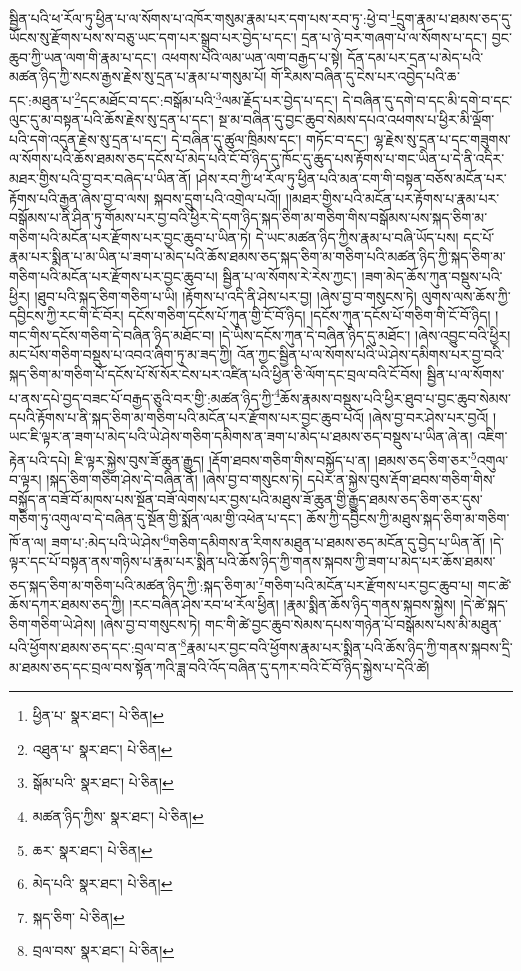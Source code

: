 སྦྱིན་པའི་ཕ་རོལ་ཏུ་ཕྱིན་པ་ལ་སོགས་པ་འཁོར་གསུམ་རྣམ་པར་དག་པས་རབ་ཏུ་:ཕྱེ་བ་\footnote{ཕྱིན་པ་  སྣར་ཐང་།  པེ་ཅིན། }དྲུག་རྣམ་པ་ཐམས་ཅད་དུ་ཡོངས་སུ་རྫོགས་པས་ས་བཅུ་ཡང་དག་པར་སྒྲུབ་པར་བྱེད་པ་དང་། དྲན་པ་ཉེ་བར་གཞག་པ་ལ་སོགས་པ་དང་། བྱང་ཆུབ་ཀྱི་ཡན་ལག་གི་རྣམ་པ་དང་། འཕགས་པའི་ལམ་ཡན་ལག་བརྒྱད་པ་སྟེ། དོན་དམ་པར་དྲན་པ་མེད་པའི་མཚན་ཉིད་ཀྱི་སངས་རྒྱས་རྗེས་སུ་དྲན་པ་རྣམ་པ་གསུམ་པོ། གོ་རིམས་བཞིན་དུ་ངེས་པར་འབྱེད་པའི་ཆ་དང་:མཐུན་པ་\footnote{འཐུན་པ་  སྣར་ཐང་།  པེ་ཅིན། }དང་མཐོང་བ་དང་:བསྒོམ་པའི་\footnote{སྒོམ་པའི་  སྣར་ཐང་།  པེ་ཅིན། }ལམ་རྗོད་པར་བྱེད་པ་དང་། དེ་བཞིན་དུ་དགེ་བ་དང་མི་དགེ་བ་དང་ལུང་དུ་མ་བསྟན་པའི་ཆོས་རྗེས་སུ་དྲན་པ་དང་། སྔ་མ་བཞིན་དུ་བྱང་ཆུབ་སེམས་དཔའ་འཕགས་པ་ཕྱིར་མི་ལྡོག་པའི་དགེ་འདུན་རྗེས་སུ་དྲན་པ་དང་། དེ་བཞིན་དུ་ཚུལ་ཁྲིམས་དང་། གཏོང་བ་དང་། ལྷ་རྗེས་སུ་དྲན་པ་དང་གཟུགས་ལ་སོགས་པའི་ཆོས་ཐམས་ཅད་དངོས་པོ་མེད་པའི་ངོ་བོ་ཉིད་དུ་ཁོང་དུ་ཆུད་པས་རྟོགས་པ་གང་ཡིན་པ་དེ་ནི་འདིར་མཐར་གྱིས་པའི་བྱ་བར་བཞེད་པ་ཡིན་ནོ། །ཤེས་རབ་ཀྱི་ཕ་རོལ་ཏུ་ཕྱིན་པའི་མན་ངག་གི་བསྟན་བཅོས་མངོན་པར་རྟོགས་པའི་རྒྱན་ཞེས་བྱ་བ་ལས། སྐབས་དྲུག་པའི་འགྲེལ་པའོ།། །།མཐར་གྱིས་པའི་མངོན་པར་རྟོགས་པ་རྣམ་པར་བསྒོམས་པ་ནི་ཤིན་ཏུ་གོམས་པར་བྱ་བའི་ཕྱིར་དེ་དག་ཉིད་སྐད་ཅིག་མ་གཅིག་གིས་བསྒོམས་པས་སྐད་ཅིག་མ་གཅིག་པའི་མངོན་པར་རྫོགས་པར་བྱང་ཆུབ་པ་ཡིན་ཏེ། དེ་ཡང་མཚན་ཉིད་ཀྱིས་རྣམ་པ་བཞི་ཡོད་པས། དང་པོ་རྣམ་པར་སྨིན་པ་མ་ཡིན་པ་ཟག་པ་མེད་པའི་ཆོས་ཐམས་ཅད་སྐད་ཅིག་མ་གཅིག་པའི་མཚན་ཉིད་ཀྱི་སྐད་ཅིག་མ་གཅིག་པའི་མངོན་པར་རྫོགས་པར་བྱང་ཆུབ་པ། སྦྱིན་པ་ལ་སོགས་རེ་རེས་ཀྱང་། །ཟག་མེད་ཆོས་ཀུན་བསྡུས་པའི་ཕྱིར། །ཐུབ་པའི་སྐད་ཅིག་གཅིག་པ་ཡི། །རྟོགས་པ་འདི་ནི་ཤེས་པར་བྱ། །ཞེས་བྱ་བ་གསུངས་ཏེ། ལུགས་ལས་ཆོས་ཀྱི་དབྱིངས་ཀྱི་རང་གི་ངོ་བོར། དངོས་གཅིག་དངོས་པོ་ཀུན་གྱི་ངོ་བོ་ཉིད། །དངོས་ཀུན་དངོས་པོ་གཅིག་གི་ངོ་བོ་ཉིད། །གང་གིས་དངོས་གཅིག་དེ་བཞིན་ཉིད་མཐོང་བ། །དེ་ཡིས་དངོས་ཀུན་དེ་བཞིན་ཉིད་དུ་མཐོང་། །ཞེས་འབྱུང་བའི་ཕྱིར། མང་པོས་གཅིག་བསྡུས་པ་འབའ་ཞིག་ཏུ་མ་ཟད་ཀྱི། འོན་ཀྱང་སྦྱིན་པ་ལ་སོགས་པའི་ཡེ་ཤེས་དམིགས་པར་བྱ་བའི་སྐད་ཅིག་མ་གཅིག་པོ་དངོས་པོ་སོ་སོར་ངེས་པར་འཛིན་པའི་ཕྱིན་ཅི་ལོག་དང་བྲལ་བའི་ངོ་བོས། སྦྱིན་པ་ལ་སོགས་པ་ནས་དཔེ་བྱད་བཟང་པོ་བརྒྱད་ཅུའི་བར་གྱི་:མཚན་ཉིད་ཀྱི་\footnote{མཚན་ཉིད་ཀྱིས་  སྣར་ཐང་།  པེ་ཅིན། }ཆོས་རྣམས་བསྡུས་པའི་ཕྱིར་ཐུབ་པ་བྱང་ཆུབ་སེམས་དཔའི་རྟོགས་པ་ནི་སྐད་ཅིག་མ་གཅིག་པའི་མངོན་པར་རྫོགས་པར་བྱང་ཆུབ་པའོ། །ཞེས་བྱ་བར་ཤེས་པར་བྱའོ། །ཡང་ཇི་ལྟར་ན་ཟག་པ་མེད་པའི་ཡེ་ཤེས་གཅིག་དམིགས་ན་ཟག་པ་མེད་པ་ཐམས་ཅད་བསྡུས་པ་ཡིན་ཞེ་ན། འཇིག་རྟེན་པའི་དཔེ། ཇི་ལྟར་སྐྱེས་བུས་ཟོ་ཆུན་རྒྱུད། །རྡོག་ཐབས་གཅིག་གིས་བསྐྱོད་པ་ན། །ཐམས་ཅད་ཅིག་ཅར་\footnote{ཆར་  སྣར་ཐང་།  པེ་ཅིན། }འགུལ་བ་ལྟར། །སྐད་ཅིག་གཅིག་ཤེས་དེ་བཞིན་ནོ། །ཞེས་བྱ་བ་གསུངས་ཏེ། དཔེར་ན་སྐྱེས་བུས་རྡོག་ཐབས་གཅིག་གིས་བསྐྱོད་ན་བཟོ་བོ་མཁས་པས་སྔོན་བཟོ་ལེགས་པར་བྱས་པའི་མཐུས་ཟོ་ཆུན་གྱི་རྒྱུད་ཐམས་ཅད་ཅིག་ཅར་དུས་གཅིག་ཏུ་འགུལ་བ་དེ་བཞིན་དུ་སྔོན་གྱི་སྨོན་ལམ་གྱི་འཕེན་པ་དང་། ཆོས་ཀྱི་དབྱིངས་ཀྱི་མཐུས་སྐད་ཅིག་མ་གཅིག་ཁོ་ན་ལ། ཟག་པ་:མེད་པའི་ཡེ་ཤེས་\footnote{མེད་པའི་  སྣར་ཐང་།  པེ་ཅིན། }གཅིག་དམིགས་ན་རིགས་མཐུན་པ་ཐམས་ཅད་མངོན་དུ་བྱེད་པ་ཡིན་ནོ། །དེ་ལྟར་དང་པོ་བསྟན་ནས་གཉིས་པ་རྣམ་པར་སྨིན་པའི་ཆོས་ཉིད་ཀྱི་གནས་སྐབས་ཀྱི་ཟག་པ་མེད་པར་ཆོས་ཐམས་ཅད་སྐད་ཅིག་མ་གཅིག་པའི་མཚན་ཉིད་ཀྱི་:སྐད་ཅིག་མ་\footnote{སྐད་ཅིག་  པེ་ཅིན། }གཅིག་པའི་མངོན་པར་རྫོགས་པར་བྱང་ཆུབ་པ། གང་ཚེ་ཆོས་དཀར་ཐམས་ཅད་ཀྱི། །རང་བཞིན་ཤེས་རབ་ཕ་རོལ་ཕྱིན། །རྣམ་སྨིན་ཆོས་ཉིད་གནས་སྐབས་སྐྱེས། །དེ་ཚེ་སྐད་ཅིག་གཅིག་ཡེ་ཤེས། །ཞེས་བྱ་བ་གསུངས་ཏེ། གང་གི་ཚེ་བྱང་ཆུབ་སེམས་དཔས་གཉེན་པོ་བསྒོམས་པས་མི་མཐུན་པའི་ཕྱོགས་ཐམས་ཅད་དང་:བྲལ་བ་ན་\footnote{བྲལ་བས་  སྣར་ཐང་།  པེ་ཅིན། }རྣམ་པར་བྱང་བའི་ཕྱོགས་རྣམ་པར་སྨིན་པའི་ཆོས་ཉིད་ཀྱི་གནས་སྐབས་དྲི་མ་ཐམས་ཅད་དང་བྲལ་བས་སྟོན་ཀའི་ཟླ་བའི་འོད་བཞིན་དུ་དཀར་བའི་ངོ་བོ་ཉིད་སྐྱེས་པ་དེའི་ཚེ། 